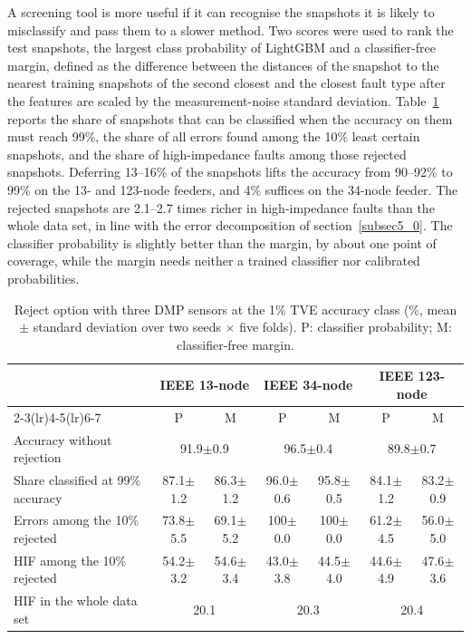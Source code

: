 \documentclass[11pt]{article}
\newenvironment{nw}{}{}
\newcommand{\hlnew}[1]{#1}
\begin{document}
\begin{nw}
A screening tool is more useful if it can recognise the snapshots it is likely to misclassify and pass them to a slower method. Two scores were used to rank the test snapshots, the largest class probability of LightGBM and a classifier-free margin, defined as the difference between the distances of the snapshot to the nearest training snapshots of the second closest and the closest fault type after the features are scaled by the measurement-noise standard deviation. Table~\ref{tab_reject} reports the share of snapshots that can be classified when the accuracy on them must reach 99\%, the share of all errors found among the 10\% least certain snapshots, and the share of high-impedance faults among those rejected snapshots. Deferring 13--16\% of the snapshots lifts the accuracy from 90--92\% to 99\% on the 13- and 123-node feeders, and 4\% suffices on the 34-node feeder. The rejected snapshots are 2.1--2.7 times richer in high-impedance faults than the whole data set, in line with the error decomposition of section~\ref{subsec5_0}. The classifier probability is slightly better than the margin, by about one point of coverage, while the margin needs neither a trained classifier nor calibrated probabilities.
\end{nw}

\begin{table}[!htbp]
\centering
\caption{\hlnew{Reject option with three DMP sensors at the 1\% TVE accuracy class (\%, mean $\pm$ standard deviation over two seeds $\times$ five folds). P: classifier probability; M: classifier-free margin.}}\label{tab_reject}
\small
\begin{tabular}{lcccccc}
\toprule
 & \multicolumn{2}{c}{IEEE 13-node} & \multicolumn{2}{c}{IEEE 34-node} & \multicolumn{2}{c}{IEEE 123-node}\\
\cmidrule(lr){2-3}\cmidrule(lr){4-5}\cmidrule(lr){6-7}
 & P & M & P & M & P & M\\
\midrule
Accuracy without rejection & \multicolumn{2}{c}{91.9$\pm$0.9} & \multicolumn{2}{c}{96.5$\pm$0.4} & \multicolumn{2}{c}{89.8$\pm$0.7}\\
Share classified at 99\% accuracy & 87.1$\pm$1.2 & 86.3$\pm$1.2 & 96.0$\pm$0.6 & 95.8$\pm$0.5 & 84.1$\pm$1.2 & 83.2$\pm$0.9\\
Errors among the 10\% rejected & 73.8$\pm$5.5 & 69.1$\pm$5.2 & 100$\pm$0.0 & 100$\pm$0.0 & 61.2$\pm$4.5 & 56.0$\pm$5.0\\
HIF among the 10\% rejected & 54.2$\pm$3.2 & 54.6$\pm$3.4 & 43.0$\pm$3.8 & 44.5$\pm$4.0 & 44.6$\pm$4.9 & 47.6$\pm$3.6\\
HIF in the whole data set & \multicolumn{2}{c}{20.1} & \multicolumn{2}{c}{20.3} & \multicolumn{2}{c}{20.4}\\
\bottomrule
\end{tabular}
\end{table}
\end{document}
